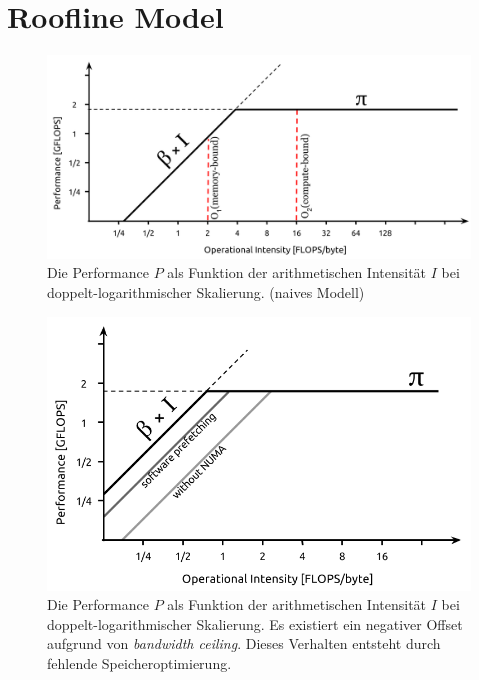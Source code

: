 		\section{Roofline Model}
		\begin{figure}[t]
		\centering
	    	\includegraphics[height=0.4\textwidth]{chapter1/pictures/roofline_model_0.png}
    		\caption[Roofline Modell - naiv]{Die Performance $P$ als Funktion der arithmetischen Intensität $I$ bei doppelt-logarithmischer Skalierung. (naives Modell) \autocite{wikiRLM}}
    		\label{1:rl0}
		\end{figure}

		\begin{figure}[t]
		\centering
	    	\includegraphics[height=0.4\textheight]{chapter1/pictures/roofline_model_1.png}
    		\caption[Roofline Modell - \textit{bandwidth ceiling}]{Die Performance $P$ als Funktion der arithmetischen Intensität $I$ bei doppelt-logarithmischer Skalierung. Es existiert ein negativer Offset aufgrund von \textit{bandwidth ceiling}. Dieses Verhalten entsteht durch fehlende Speicheroptimierung. \autocite{wikiRLM}}
    		\label{1:rl1}
		\end{figure}
	

